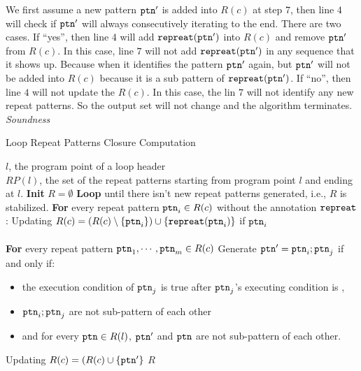 \begin{enumerate}
We first assume a new pattern $\mathtt{ptn}'$ is added into $R(c)$ at step $7$, 
%
then line $4$ will check if $\mathtt{ptn}'$ will always consecutively iterating to the end.
There are two cases.
If ``yes'', then line $4$ will add $\mathtt{repreat}(\mathtt{ptn}')$ into $R(c)$ and remove $\mathtt{ptn}'$ from $R(c)$.
In this case, line $7$ will not add $\mathtt{repreat}(\mathtt{ptn}')$ in any sequence that it shows up.
Because when it identifies the pattern $\mathtt{ptn}'$ again, but $\mathtt{ptn}'$ will not be added into $R(c)$ because
it is a sub pattern of $\mathtt{repreat}(\mathtt{ptn}')$.
If ``no'', then line $4$ will not update the $R(c)$. 
In this case, the lin $7$ will not identify any new repeat patterns. So the output set will not change and the algorithm terminates.
\\
\emph{Soundness} 

\end{enumerate}
%
\begin{algorithm}
\caption{
{Loop Repeat Patterns Closure Computation}
\label{alg:loop-repeat-pattern}
}
\begin{algorithmic}[1]
\REQUIRE $l$, the program point of a loop header
\\ \quad
$RP(l)$, the set of the repeat patterns starting from program point $l$ and ending at $l$.
\STATE  \textbf{Init} $R = \emptyset$
\STATE  \textbf{Loop} until there isn't new repeat patterns generated, i.e., $R$ is stabilized.
\STATE  \quad \textbf{For} every repeat pattern $\mathtt{ptn}_i \in R(c)$ without the annotation $\mathtt{repreat}$:
\STATE  \quad \quad Updating $R(c) = (R(c) \setminus \{\mathtt{ptn}_{i}\}) \cup \{\mathtt{repreat}(\mathtt{ptn}_i)\}$
if $\mathtt{ptn}_i$ 
\\ \quad \quad {}
\\ \quad \quad 
{}
\STATE  \quad \textbf{For} every repeat pattern $\mathtt{ptn}_1, \cdots, \mathtt{ptn}_m \in R(c)$
\STATE \quad \quad  Generate $\mathtt{ptn}' = \mathtt{ptn}_{i}; \mathtt{ptn}_{j} $ 
if and only if:
\begin{itemize}
  \item  the execution condition of $\mathtt{ptn}_{j}$
is true after $\mathtt{ptn}_{j}$'s executing condition is , 
\item   $\mathtt{ptn}_{i}; \mathtt{ptn}_{j}$ are not sub-pattern of each other
\item  and for every $\mathtt{ptn} \in R(l)$, $\mathtt{ptn}'$ and $\mathtt{ptn}$ are not sub-pattern of each other.
\end{itemize}
\STATE  \quad \quad Updating $R(c) = (R(c) \cup \{\mathtt{ptn}'\}$
\RETURN $R$
\end{algorithmic}
\end{algorithm}
